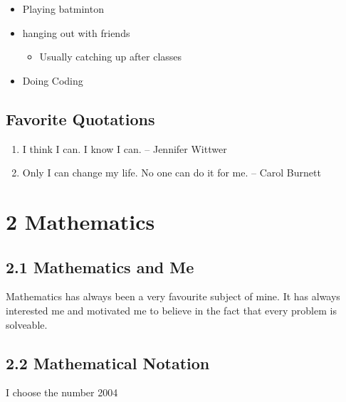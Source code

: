 \documentclass[12pt]{article}
\begin{document}
\begin{itemize}
    \item Playing batminton
    \item hanging out with friends
        \begin{itemize}
            \item Usually catching up after classes
        \end{itemize}
    \item Doing Coding
\end{itemize}

\subsection*{Favorite Quotations}
\begin{enumerate}
    \item I think I can. I know I can. – Jennifer Wittwer
    \item Only I can change my life. No one can do it for me. – Carol Burnett
\end{enumerate}


\section*{2 Mathematics}

\subsection*{2.1 Mathematics and Me}
Mathematics has always been a very favourite subject of mine. It has always interested me and motivated me to believe in the fact that every problem is solveable.

\subsection*{2.2 Mathematical Notation}
I choose the number 2004 
\end{document}
